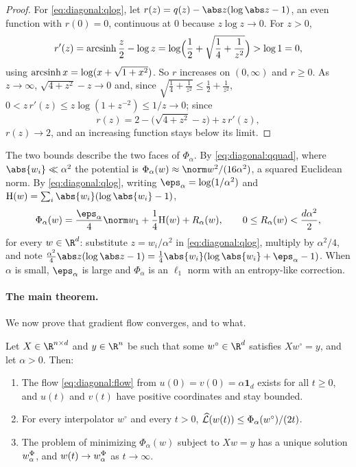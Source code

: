 \begin{refsection}
\begin{proof}
For \eqref{eq:diagonal:qlog}, let $r(z)=q(z)-\abs z(\log\abs z-1)$, an even function with $r(0)=0$, continuous at $0$ because $z\log z\to0$. For $z>0$,
\[
  r'(z)=\operatorname{arcsinh}\frac z2-\log z=\log\Bigl(\frac12+\sqrt{\frac14+\frac1{z^2}}\Bigr)>\log1=0,
\]
using $\operatorname{arcsinh} x=\log(x+\sqrt{1+x^2})$. So $r$ increases on $(0,\infty)$ and $r\ge0$. As $z\to\infty$, $\sqrt{4+z^2}-z\to0$ and, since $\sqrt{\frac14+\frac1{z^2}}\le\frac12+\frac1{z^2}$, $0<z\,r'(z)\le z\log(1+z^{-2})\le1/z\to0$; since
\[
  r(z)=2-\bigl(\sqrt{4+z^2}-z\bigr)+z\,r'(z),
\]
$r(z)\to2$, and an increasing function stays below its limit.
\end{proof}

The two bounds describe the two faces of $\Phi_\alpha$. By \eqref{eq:diagonal:qquad}, where $\abs{w_i}\ll\alpha^2$ the potential is $\Phi_\alpha(w)\approx\norm w^2/(16\alpha^2)$, a squared Euclidean norm. By \eqref{eq:diagonal:qlog}, writing $\eps_\alpha=\log(1/\alpha^2)$ and $\diagH(w)=\sum_i\abs{w_i}(\log\abs{w_i}-1)$,
\begin{equation}\label{eq:diagonal:l1form}
  \Phi_\alpha(w)=\frac{\eps_\alpha}4\norm w_1+\frac14\diagH(w)+R_\alpha(w),\qquad 0\le R_\alpha(w)<\frac{d\alpha^2}2,
\end{equation}
for every $w\in\R^d$: substitute $z=w_i/\alpha^2$ in \eqref{eq:diagonal:qlog}, multiply by $\alpha^2/4$, and note $\frac{\alpha^2}4\abs z(\log\abs z-1)=\frac14\abs{w_i}(\log\abs{w_i}+\eps_\alpha-1)$. When $\alpha$ is small, $\eps_\alpha$ is large and $\Phi_\alpha$ is an $\ell_1$ norm with an entropy-like correction.

\paragraph{The main theorem.} We now prove that gradient flow converges, and to what.

\begin{theorem}\label{thm:diagonal:bias}
Let $X\in\R^{n\times d}$ and $y\in\R^n$ be such that some $w^\circ\in\R^d$ satisfies $Xw^\circ=y$, and let $\alpha>0$. Then:
\begin{enumerate}
\item The flow \eqref{eq:diagonal:flow} from $u(0)=v(0)=\alpha\mathbf 1_d$ exists for all $t\ge0$, and $u(t)$ and $v(t)$ have positive coordinates and stay bounded.
\item For every interpolator $w^\circ$ and every $t>0$, $\widehat{\mathcal{L}}(w(t))\le\Phi_\alpha(w^\circ)/(2t)$.
\item The problem of minimizing $\Phi_\alpha(w)$ subject to $Xw=y$ has a unique solution $w^\Phi_\alpha$, and $w(t)\to w^\Phi_\alpha$ as $t\to\infty$.
\end{enumerate}
\end{theorem}


\end{refsection}
